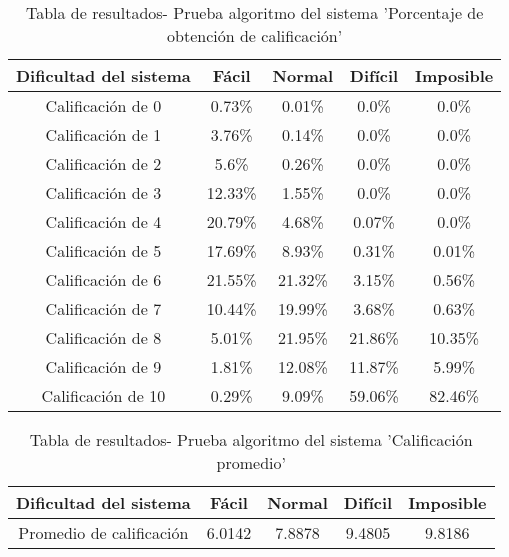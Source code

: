 \begin{table}[h!]
    \centering
    \begin{tabular}{|c|c|c|c|c|} \hline
        Dificultad del sistema & Fácil &     Normal &    Difícil &   Imposible \\\hline
        Calificación de 0 &  0.73\% &    0.01\% &   0.0\%  &  0.0\%   \\\hline
        Calificación de 1 &  3.76\% &    0.14\% &   0.0\%  &  0.0\%\\\hline
        Calificación de 2 &  5.6\% &    0.26\% &   0.0\%  &  0.0\%\\\hline
        Calificación de 3 &  12.33\% &    1.55\% &   0.0\%  &  0.0\%\\\hline
        Calificación de 4 &  20.79\% &    4.68\% &   0.07\%  &  0.0\%\\\hline
        Calificación de 5 &  17.69\% &    8.93\% &   0.31\%  &  0.01\%\\\hline
        Calificación de 6 &  21.55\% &    21.32\% &   3.15\%  &  0.56\%\\\hline
        Calificación de 7 &  10.44\% &    19.99\% &   3.68\%  &  0.63\%\\\hline
        Calificación de 8 &  5.01\% &    21.95\% &   21.86\%  &  10.35\%\\\hline
        Calificación de 9 &  1.81\% &    12.08\% &   11.87\%  &  5.99\%\\\hline
        Calificación de 10 &  0.29\% &    9.09\% &   59.06\%  &  82.46\%\\\hline
    \end{tabular}
    \caption{Tabla de resultados- Prueba algoritmo del sistema 'Porcentaje de obtención de calificación'}
    \label{table:resultados-calificaciones-algoritmo-sistema}
\end{table}


\begin{table}[h!]
    \centering
    \begin{tabular}{|c|c|c|c|c|} \hline
        Dificultad del sistema &                 Fácil &     Normal &    Difícil &   Imposible \\\hline
        Promedio de calificación &  6.0142 &    7.8878 &    9.4805 &    9.8186 \\ \hline
    \end{tabular}
    \caption{Tabla de resultados- Prueba algoritmo del sistema 'Calificación promedio'}
    \label{table:resultados-calificacion-promedio-algoritmo-sistema}
\end{table}


